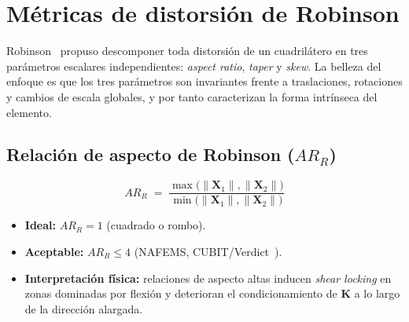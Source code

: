 \documentclass[11pt,a4paper]{article}
\begin{document}
\section{M\'etricas de distorsi\'on de Robinson}
\label{sec:robinson}

Robinson~\cite{Robinson1987} propuso descomponer toda distorsi\'on de un cuadril\'atero en tres par\'ametros escalares independientes: \emph{aspect ratio}, \emph{taper} y \emph{skew}. La belleza del enfoque es que los tres par\'ametros son invariantes frente a traslaciones, rotaciones y cambios de escala globales, y por tanto caracterizan la forma intr\'inseca del elemento.

\subsection{Relaci\'on de aspecto de Robinson ($AR_R$)}
\begin{equation}
\boxed{\;AR_R \;=\; \frac{\max\bigl(\|\mathbf{X}_1\|,\|\mathbf{X}_2\|\bigr)}{\min\bigl(\|\mathbf{X}_1\|,\|\mathbf{X}_2\|\bigr)}\;}
\label{eq:AR_R}
\end{equation}
\begin{itemize}[leftmargin=1.2em]
  \item \textbf{Ideal:} $AR_R = 1$ (cuadrado o rombo).
  \item \textbf{Aceptable:} $AR_R \le 4$ (NAFEMS, CUBIT/Verdict~\cite{Verdict2007}).
  \item \textbf{Interpretaci\'on f\'isica:} relaciones de aspecto altas inducen \emph{shear locking} en zonas dominadas por flexi\'on y deterioran el condicionamiento de $\mathbf{K}$ a lo largo de la direcci\'on alargada.
\end{itemize}
\end{document}
